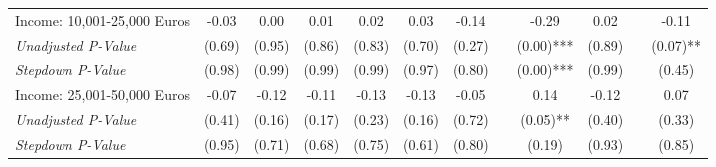 \begin{tabular}{l c c c c c c c c c c c}
Income: 10,001-25,000 Euros & -0.03 & 0.00 & 0.01 & 0.02 & 0.03 & -0.14 & & -0.29 & 0.02 & & -0.11 \\
\quad \textit{Unadjusted P-Value} & (0.69) & (0.95) & (0.86) & (0.83) & (0.70) & (0.27) & & (0.00)*** & (0.89) & & (0.07)** \\
\quad \textit{Stepdown P-Value} & (0.98) & (0.99) & (0.99) & (0.99) & (0.97) & (0.80) & & (0.00)*** & (0.99) & & (0.45) \\
Income: 25,001-50,000 Euros & -0.07 & -0.12 & -0.11 & -0.13 & -0.13 & -0.05 & & 0.14 & -0.12 & & 0.07 \\
\quad \textit{Unadjusted P-Value} & (0.41) & (0.16) & (0.17) & (0.23) & (0.16) & (0.72) & & (0.05)** & (0.40) & & (0.33) \\
\quad \textit{Stepdown P-Value} & (0.95) & (0.71) & (0.68) & (0.75) & (0.61) & (0.80) & & (0.19) & (0.93) & & (0.85) \\
\bottomrule
\end{tabular}
